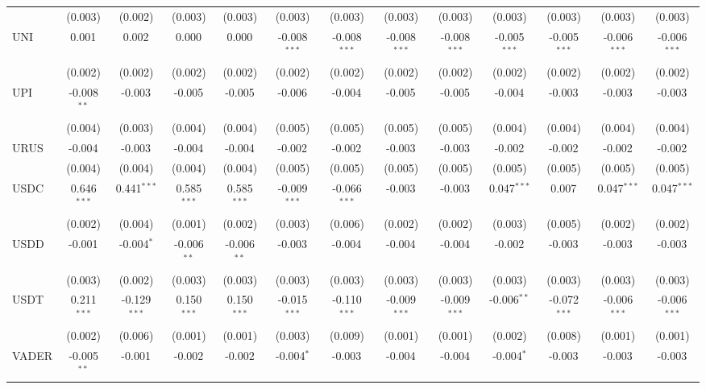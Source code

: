 \begin{table}[!htbp]
\begin{tabular}{@{\extracolsep{5pt}}lcccccccccccc}
  & (0.003) & (0.002) & (0.003) & (0.003) & (0.003) & (0.003) & (0.003) & (0.003) & (0.003) & (0.003) & (0.003) & (0.003) \\
 UNI & 0.001$^{}$ & 0.002$^{}$ & 0.000$^{}$ & 0.000$^{}$ & -0.008$^{***}$ & -0.008$^{***}$ & -0.008$^{***}$ & -0.008$^{***}$ & -0.005$^{***}$ & -0.005$^{***}$ & -0.006$^{***}$ & -0.006$^{***}$ \\
  & (0.002) & (0.002) & (0.002) & (0.002) & (0.002) & (0.002) & (0.002) & (0.002) & (0.002) & (0.002) & (0.002) & (0.002) \\
 UPI & -0.008$^{**}$ & -0.003$^{}$ & -0.005$^{}$ & -0.005$^{}$ & -0.006$^{}$ & -0.004$^{}$ & -0.005$^{}$ & -0.005$^{}$ & -0.004$^{}$ & -0.003$^{}$ & -0.003$^{}$ & -0.003$^{}$ \\
  & (0.004) & (0.003) & (0.004) & (0.004) & (0.005) & (0.005) & (0.005) & (0.005) & (0.004) & (0.004) & (0.004) & (0.004) \\
 URUS & -0.004$^{}$ & -0.003$^{}$ & -0.004$^{}$ & -0.004$^{}$ & -0.002$^{}$ & -0.002$^{}$ & -0.003$^{}$ & -0.003$^{}$ & -0.002$^{}$ & -0.002$^{}$ & -0.002$^{}$ & -0.002$^{}$ \\
  & (0.004) & (0.004) & (0.004) & (0.004) & (0.005) & (0.005) & (0.005) & (0.005) & (0.005) & (0.005) & (0.005) & (0.005) \\
 USDC & 0.646$^{***}$ & 0.441$^{***}$ & 0.585$^{***}$ & 0.585$^{***}$ & -0.009$^{***}$ & -0.066$^{***}$ & -0.003$^{}$ & -0.003$^{}$ & 0.047$^{***}$ & 0.007$^{}$ & 0.047$^{***}$ & 0.047$^{***}$ \\
  & (0.002) & (0.004) & (0.001) & (0.002) & (0.003) & (0.006) & (0.002) & (0.002) & (0.003) & (0.005) & (0.002) & (0.002) \\
 USDD & -0.001$^{}$ & -0.004$^{*}$ & -0.006$^{**}$ & -0.006$^{**}$ & -0.003$^{}$ & -0.004$^{}$ & -0.004$^{}$ & -0.004$^{}$ & -0.002$^{}$ & -0.003$^{}$ & -0.003$^{}$ & -0.003$^{}$ \\
  & (0.003) & (0.002) & (0.003) & (0.003) & (0.003) & (0.003) & (0.003) & (0.003) & (0.003) & (0.003) & (0.003) & (0.003) \\
 USDT & 0.211$^{***}$ & -0.129$^{***}$ & 0.150$^{***}$ & 0.150$^{***}$ & -0.015$^{***}$ & -0.110$^{***}$ & -0.009$^{***}$ & -0.009$^{***}$ & -0.006$^{**}$ & -0.072$^{***}$ & -0.006$^{***}$ & -0.006$^{***}$ \\
  & (0.002) & (0.006) & (0.001) & (0.001) & (0.003) & (0.009) & (0.001) & (0.001) & (0.002) & (0.008) & (0.001) & (0.001) \\
 VADER & -0.005$^{**}$ & -0.001$^{}$ & -0.002$^{}$ & -0.002$^{}$ & -0.004$^{*}$ & -0.003$^{}$ & -0.004$^{}$ & -0.004$^{}$ & -0.004$^{*}$ & -0.003$^{}$ & -0.003$^{}$ & -0.003$^{}$ \\

\end{tabular}
\end{table}
